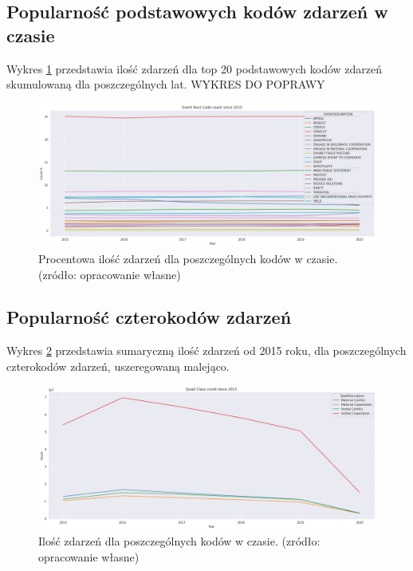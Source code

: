 \documentclass[11pt]{report}
\begin{document}
 \subsection{Popularność podstawowych kodów zdarzeń w czasie}
  Wykres \ref{fig:GLOBALERCperc} przedstawia ilość zdarzeń dla top 20 podstawowych kodów zdarzeń skumulowaną dla poszczególnych lat.
   WYKRES DO POPRAWY
     \begin{figure}[ht]
	\centering
	\includegraphics[width=0.8 \textwidth]{fig/GLOBAL/ERCperc.png}
	\caption{Procentowa ilość zdarzeń dla poszczególnych kodów w czasie. (zródło: opracowanie własne)}
	\label{fig:GLOBALERCperc}
	\end{figure}
	
 \subsection{Popularność czterokodów zdarzeń}
  	Wykres \ref{fig:GLOBALQC} przedstawia sumaryczną ilość zdarzeń od 2015 roku, dla poszczególnych czterokodów zdarzeń, uszeregowaną malejąco.
  	\begin{figure}[ht]
	\centering
	\includegraphics[width=0.8 \textwidth]{fig/GLOBAL/QC.png}
	\caption{Ilość zdarzeń dla poszczególnych kodów w czasie. (zródło: opracowanie własne)}
	\label{fig:GLOBALQC}
	\end{figure}
	
\end{document}
